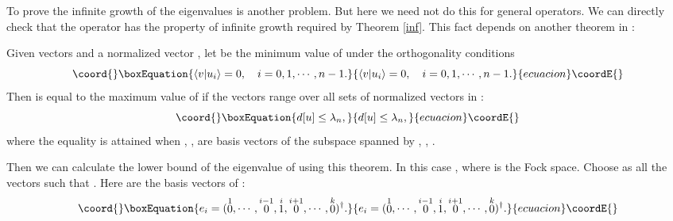 \documentclass[a4paper,a4paper]{article}
\begin{document}
To prove the infinite growth of the eigenvalues is another
problem. But here we need not do this for general operators. We
can directly check that the operator \coordHE{} has the property of
infinite growth required by Theorem \ref{inf}. This fact depends
on another theorem in \cite{Hilbert}:
\begin{theorem}
Given \coordHE{} vectors \coordHE{} and a
normalized vector \coordHE{}, let \coordHE{} be the minimum value of
\coordHE{} under the orthogonality conditions
\begin{equation}\coord{}\boxEquation{\label{ortho}
\langle v|u_i\rangle=0,\quad i=0,1,\cdots,n-1.
}{\langle v|u_i\rangle=0,\quad i=0,1,\cdots,n-1.
}{ecuacion}\coordE{}\end{equation}
Then \coordHE{} is equal to the maximum value of \coordHE{} if the
vectors \coordHE{} range over all sets
of normalized vectors in \coordHE{}:
\begin{equation}\coord{}\boxEquation{
d[u]\leq\lambda_n,
}{
d[u]\leq\lambda_n,
}{ecuacion}\coordE{}\end{equation}
where the equality is attained when \coordHE{}, \myHighlight{$\cdots$}\coordHE{},
\coordHE{} are basis vectors of the subspace spanned by
\coordHE{}, \myHighlight{$\cdots$}\coordHE{}, \coordHE{}.
\end{theorem}
Then we can calculate the lower bound of the eigenvalue
\coordHE{} of \coordHE{} using this theorem. In this case
\coordHE{}, where \coordHE{}
is the Fock space. Choose \coordHE{} as
all the vectors \coordHE{} such
that \coordHE{}. Here \coordHE{} are the basis
vectors of \coordHE{}:
\begin{equation}\coord{}\boxEquation{
e_i=(\stackrel{1}{0},\cdots,\stackrel{i-1}{0},
\stackrel{i}{1},\stackrel{i+1}{0},\cdots,\stackrel{k}{0})^\dag.
}{
e_i=(\stackrel{1}{0},\cdots,\stackrel{i-1}{0},
\stackrel{i}{1},\stackrel{i+1}{0},\cdots,\stackrel{k}{0})^\dag.
}{ecuacion}\coordE{}\end{equation}
\end{document}
